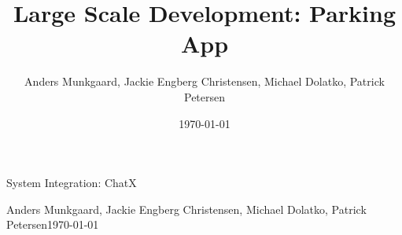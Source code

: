 \documentclass[a4paper,12pt]{report}
\title{Large Scale Development: Parking App}
\author{Anders Munkgaard, Jackie Engberg Christensen, Michael Dolatko, Patrick Petersen}
\date{\today}
\begin{document}
\begin{titlepage}
\centering
{\LARGE System Integration: ChatX}
\begin{figure}[H]
\centering
\end{figure}

{\large Anders Munkgaard, Jackie Engberg Christensen, Michael Dolatko, Patrick Petersen\linebreak \today}
\end{titlepage}


\tableofcontents







\newpage



\end{document}
